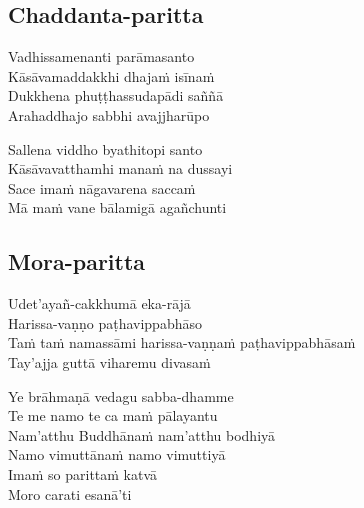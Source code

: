 \subsection{Chaddanta-paritta}
\label{vadhissamenanti}



\begin{paritta}
Vadhissamenanti parāmasanto\\
Kāsāvamaddakkhi dhajaṁ isīnaṁ\\
Dukkhena phuṭṭhassudapādi saññā\\
Arahaddhajo sabbhi avajjharūpo

Sallena viddho byathitopi santo\\
Kāsāvavatthamhi manaṁ na dussayi\\
Sace imaṁ nāgavarena saccaṁ\\
Mā maṁ vane bālamigā agañchunti
\end{paritta}

\subsection{Mora-paritta}
\label{udetayan-cakkhuma}


\enlargethispage{\baselineskip}

\vspace*{-.5\baselineskip}


\vspace*{-.2\baselineskip}

Udet'ayañ-cakkhumā eka-rājā\\
Harissa-vaṇṇo paṭhavippabhāso\\
Taṁ taṁ namassāmi harissa-vaṇṇaṁ paṭhavippabhāsaṁ\\
Tay'ajja guttā viharemu divasaṁ

Ye brāhmaṇā vedagu sabba-dhamme\\
Te me namo te ca maṁ pālayantu\\
Nam'atthu Buddhānaṁ nam'atthu bodhiyā\\
Namo vimuttānaṁ namo vimuttiyā\\
Imaṁ so parittaṁ katvā\\
Moro carati esanā'ti

\vspace*{-.1\baselineskip}

